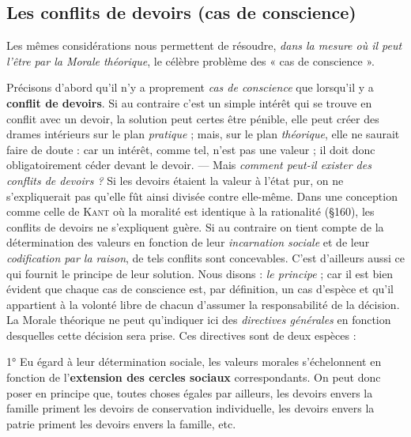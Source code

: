 \subsection{Les conflits de devoirs (cas de conscience)}%
Les mêmes
considérations nous permettent de résoudre, {\it dans la mesure où il
peut l'être par la Morale théorique}, le célèbre problème des « cas de
conscience ».

Précisons d’abord qu’il n’y a proprement {\it cas de conscience} que
lorsqu'il y a {\bf conflit de devoirs}. Si au contraire c’est un simple intérêt
qui se trouve en conflit avec un devoir, la solution peut certes être
pénible, elle peut créer des drames intérieurs sur le plan {\it pratique} ;
mais, sur le plan {\it théorique}, elle ne saurait faire de doute : car un intérêt,
comme tel, n’est pas une valeur ; il doit donc obligatoirement
céder devant le devoir. — Mais {\it comment peut-il exister des conflits de
devoirs ?} Si les devoirs étaient la valeur à l’état pur, on ne s’expliquerait
pas qu’elle fût ainsi divisée contre elle-même. Dans une conception
comme celle de \textsc{Kant} où la moralité est identique à la rationalité
(\S 160), les conflits de devoirs ne s’expliquent guère. Si au contraire
on tient compte de la détermination des valeurs en fonction de
leur {\it incarnation sociale} et de leur {\it codification par la raison}, de tels
conflits sont concevables. C’est d’ailleurs aussi ce qui fournit le principe
de leur solution. Nous disons : {\it le principe} ; car il est bien évident
que chaque cas de conscience est, par définition, un cas d’espèce
et qu’il appartient à la volonté libre de chacun d’assumer la responsabilité
de la décision. La Morale théorique ne peut qu’indiquer ici des
{\it directives générales} en fonction desquelles cette décision sera prise.
Ces directives sont de deux espèces :

1° Eu égard à leur détermination sociale, les valeurs morales
s’échelonnent en fonction de l’{\bf extension des cercles sociaux} correspondants.
On peut donc poser en principe que, toutes choses égales
par ailleurs, les devoirs envers la famille priment les devoirs de conservation
individuelle, les devoirs envers la patrie priment les devoirs
envers la famille, etc.

